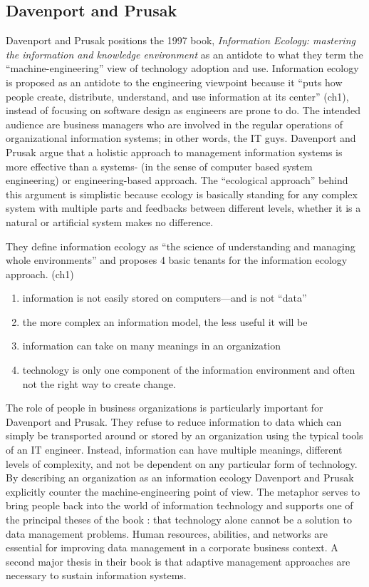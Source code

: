 \subsection{Davenport and Prusak}

Davenport and Prusak positions the 1997 book, \textit{Information Ecology: mastering the information and knowledge environment} as an antidote to what they term the ``machine-engineering'' view of technology adoption and use.  Information ecology is proposed as an antidote to the engineering viewpoint because it ``puts how people create, distribute, understand, and use information at its center'' (ch1), instead of focusing on software design as engineers are prone to do. The intended audience are business managers who are involved in the regular operations of organizational information systems; in other words, the IT guys. Davenport and Prusak argue that a holistic approach to management information systems is more effective than a systems- (in the sense of computer based system engineering) or engineering-based approach. The ``ecological approach'' behind this argument is simplistic because ecology is basically standing for any complex system with multiple parts and feedbacks between different levels, whether it is a natural or artificial system makes no difference.

They define information ecology as ``the science of understanding and managing whole environments'' and proposes 4 basic tenants for the information ecology approach. (ch1)
\begin{enumerate}
\item information is not easily stored on computers—and is not ``data''
\item the more complex an information model, the less useful it will be
\item information can take on many meanings in an organization
\item technology is only one component of the information environment and often not the right way to create change.
\end{enumerate}

The role of people in business organizations is particularly important for Davenport and Prusak.  They refuse to reduce information to data which can simply be transported around or stored by an organization using the typical tools of an IT engineer.  Instead, information can have multiple meanings, different levels of complexity, and not be dependent on any particular form of technology. By describing an organization as an information ecology Davenport and Prusak explicitly counter the machine-engineering point of view. The metaphor serves to bring people back into the world of information technology and supports one of the principal theses of the book : that technology alone cannot be a solution to data management problems. Human resources, abilities, and networks are essential for improving data management in a corporate business context. A second major thesis in their book is that adaptive management approaches are necessary to sustain information systems.

